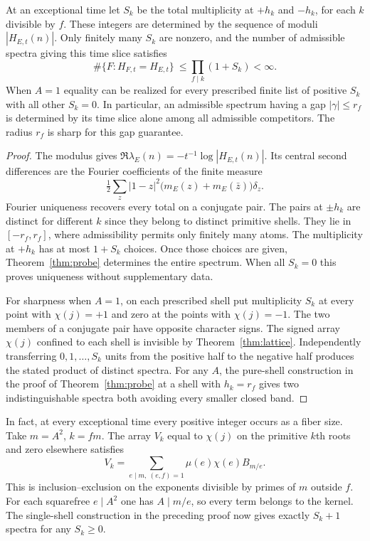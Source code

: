 \begin{theorem}\label{thm:finitefiber}
At an exceptional time let $S_k$ be the total multiplicity at $+h_k$ and $-h_k$, for each $k$ divisible by $f$. These integers are determined by the sequence of moduli $|H_{E,t}(n)|$. Only finitely many $S_k$ are nonzero, and the number of admissible spectra giving this time slice satisfies
\[
 \#\{F:H_{F,t}=H_{E,t}\}\ \le\prod_{f\mid k}(1+S_k)<\infty.
\]
When $A=1$ equality can be realized for every prescribed finite list of positive $S_k$ with all other $S_k=0$. In particular, an admissible spectrum having a gap $|\gamma|\le r_f$ is determined by its time slice alone among all admissible competitors. The radius $r_f$ is sharp for this gap guarantee.
\end{theorem}
\begin{proof}
The modulus gives $\Re\lambda_E(n)=-t^{-1}\log |H_{E,t}(n)|$. Its central second differences are the Fourier coefficients of the finite measure
\[
 \tfrac12\sum_z |1-z|^2\bigl(m_E(z)+m_E(\bar z)\bigr)\delta_z.
\]
Fourier uniqueness recovers every total on a conjugate pair. The pairs at $\pm h_k$ are distinct for different $k$ since they belong to distinct primitive shells. They lie in $[-r_f,r_f]$, where admissibility permits only finitely many atoms. The multiplicity at $+h_k$ has at most $1+S_k$ choices. Once those choices are given, Theorem~\ref{thm:probe} determines the entire spectrum. When all $S_k=0$ this proves uniqueness without supplementary data.

For sharpness when $A=1$, on each prescribed shell put multiplicity $S_k$ at every point with $\chi(j)=+1$ and zero at the points with $\chi(j)=-1$. The two members of a conjugate pair have opposite character signs. The signed array $\chi(j)$ confined to each shell is invisible by Theorem~\ref{thm:lattice}. Independently transferring $0,1,\ldots,S_k$ units from the positive half to the negative half produces the stated product of distinct spectra. For any $A$, the pure-shell construction in the proof of Theorem~\ref{thm:probe} at a shell with $h_k=r_f$ gives two indistinguishable spectra both avoiding every smaller closed band.
\end{proof}

In fact, at every exceptional time every positive integer occurs as a fiber
size. Take $m=A^2$, $k=fm$. The array $V_k$ equal to $\chi(j)$ on the
primitive $k$th roots and zero elsewhere satisfies
\[
 V_k=\sum_{e\mid m,\ (e,f)=1}\mu(e)\chi(e) B_{m/e}.
\]
This is inclusion--exclusion on the exponents divisible by primes of $m$
outside $f$. For each squarefree $e\mid A^2$ one has $A\mid m/e$,
so every term belongs to the kernel. The single-shell construction in the
preceding proof now gives exactly $S_k+1$ spectra for any $S_k\ge0$.
